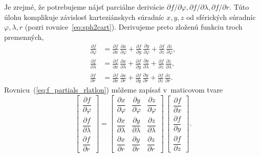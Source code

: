 \documentclass[a4paper, 12pt]{book}
\begin{document}
Je zrejmé, že potrebujeme nájsť parciálne derivácie $\partial f \slash \partial 
\varphi, \partial f \slash \partial \lambda, \partial f \slash \partial r$.  
Túto úlohu komplikuje závislosť karteziánskych súradníc $x, y, z$ od sférických 
súradníc $\varphi, \lambda, r$ (pozri rovnice~\ref{eq:sph2cart}).  Derivujeme 
preto zloženú funkciu troch premenných,
%
\begin{equation}
\label{eq:f_partials_rlatlon}
\begin{split}
\frac{\partial f}{\partial \varphi} &= \frac{\partial f}{\partial x} \, 
\frac{\partial x}{\partial \varphi} + \frac{\partial f}{\partial y} \, 
\frac{\partial y}{\partial \varphi} + \frac{\partial f}{\partial z} \, 
\frac{\partial z}{\partial \varphi}{,}\\[2ex]
%
\frac{\partial f}{\partial \lambda} &= \frac{\partial f}{\partial x} \, 
\frac{\partial x}{\partial \lambda} + \frac{\partial f}{\partial y} \, 
\frac{\partial y}{\partial \lambda} + \frac{\partial f}{\partial z} \, 
\frac{\partial z}{\partial \lambda}{,}\\[2ex]
%
\frac{\partial f}{\partial r} &= \frac{\partial f}{\partial x} \, 
\frac{\partial x}{\partial r} + \frac{\partial f}{\partial y} \, \frac{\partial 
y}{\partial r} + \frac{\partial f}{\partial z} \, \frac{\partial z}{\partial 
r}{.}
\end{split}
\end{equation}
%
Rovnicu~(\ref{eq:f_partials_rlatlon}) môžeme zapísať v~maticovom tvare
%
\begin{equation}
\label{eq:f_partials_rlatlon_2}
\begin{bmatrix}
\dfrac{\partial f}{\partial \varphi}\\[2ex]
\dfrac{\partial f}{\partial \lambda}\\[2ex]
\dfrac{\partial f}{\partial r}
\end{bmatrix}
%
=
%
\begin{bmatrix}
\dfrac{\partial x}{\partial \varphi} & \dfrac{\partial y}{\partial \varphi} 
& \dfrac{\partial z}{\partial \varphi}\\[2ex]
\dfrac{\partial x}{\partial \lambda} & \dfrac{\partial y}{\partial \lambda
} & \dfrac{\partial z}{\partial \lambda}\\[2ex]
\dfrac{\partial x}{\partial r} & \dfrac{\partial y}{\partial r} 
& \dfrac{\partial z}{\partial r}
\end{bmatrix}
%
\,
%
\begin{bmatrix}
\dfrac{\partial f}{\partial x}\\[2ex]
\dfrac{\partial f}{\partial y}\\[2ex]
\dfrac{\partial f}{\partial z}
\end{bmatrix}
%
{.}
\end{equation}
\end{document}
